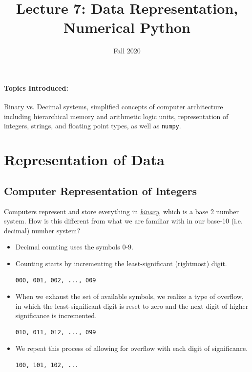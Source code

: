 \documentclass[12pt,letterpaper,twoside]{article}
\begin{document}
\title{Lecture 7: Data Representation, Numerical Python\vspace{-5ex}}
\date{Fall 2020}
\maketitle

{\footnotesize
\paragraph{Topics Introduced:} Binary vs. Decimal systems, simplified
concepts of computer architecture including hierarchical memory and
arithmetic logic units, representation of integers, strings, and
floating point types, as well as \texttt{numpy}.
}
\vspace{-3ex}
\section{Representation of Data}

\subsection{Computer Representation of Integers}
Computers represent and store everything in
\href{https://en.wikipedia.org/wiki/Binary_number#Binary_counting}{\emph{binary}},
which is a base 2 number system. How is this different from what we
are familiar with in our base-10 (i.e. decimal) number system?

\begin{itemize}
\item Decimal counting uses the symbols 0-9.
\item Counting starts by incrementing the least-significant
  (rightmost) digit.

\begin{verbatim}
000, 001, 002, ..., 009
\end{verbatim}
\item When we exhaust the set of available symbols, we realize a type
  of overflow, in which the least-significant digit is reset to zero
  and the next digit of higher significance is incremented.

\begin{verbatim}
010, 011, 012, ..., 099
\end{verbatim}

\item We repeat this process of allowing for overflow with each digit
  of significance.

\begin{verbatim}
100, 101, 102, ...  
\end{verbatim}
\end{itemize}
\end{document}
